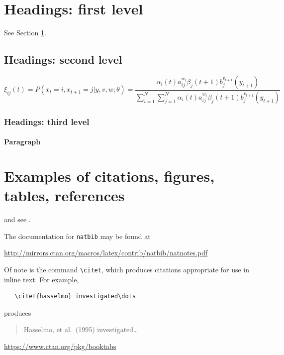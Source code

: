 \documentclass{article}
\begin{document}
\section{Headings: first level}
\label{sec:headings}

\lipsum[4] See Section \ref{sec:headings}.

\subsection{Headings: second level}
\lipsum[5]
\begin{equation}
\xi _{ij}(t)=P(x_{t}=i,x_{t+1}=j|y,v,w;\theta)= {\frac {\alpha _{i}(t)a^{w_t}_{ij}\beta _{j}(t+1)b^{v_{t+1}}_{j}(y_{t+1})}{\sum _{i=1}^{N} \sum _{j=1}^{N} \alpha _{i}(t)a^{w_t}_{ij}\beta _{j}(t+1)b^{v_{t+1}}_{j}(y_{t+1})}}
\end{equation}

\subsubsection{Headings: third level}
\lipsum[6]

\paragraph{Paragraph}
\lipsum[7]

\section{Examples of citations, figures, tables, references}
\label{sec:others}
\lipsum[8] \cite{kour2014real,kour2014fast} and see \cite{hadash2018estimate}.

The documentation for \verb+natbib+ may be found at
\begin{center}
  \url{http://mirrors.ctan.org/macros/latex/contrib/natbib/natnotes.pdf}
\end{center}
Of note is the command \verb+\citet+, which produces citations
appropriate for use in inline text.  For example,
\begin{verbatim}
   \citet{hasselmo} investigated\dots
\end{verbatim}
produces
\begin{quote}
  Hasselmo, et al.\ (1995) investigated\dots
\end{quote}

\begin{center}
  \url{https://www.ctan.org/pkg/booktabs}
\end{center}
\end{document}
